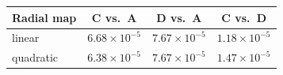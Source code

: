 \begin{tabular}{lccc}
\toprule
Radial map & C vs.\ A & D vs.\ A & C vs.\ D \\
\midrule
linear & $6.68\times 10^{-5}$ & $7.67\times 10^{-5}$ & $1.18\times 10^{-5}$ \\
quadratic & $6.38\times 10^{-5}$ & $7.67\times 10^{-5}$ & $1.47\times 10^{-5}$ \\
\bottomrule
\end{tabular}
